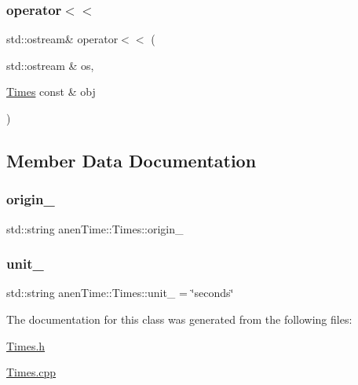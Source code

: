 \subsubsection{\texorpdfstring{operator$<$$<$}{operator<<}}
{\footnotesize\ttfamily std\+::ostream\& operator$<$$<$ (\begin{DoxyParamCaption}\item[{std\+::ostream \&}]{os,  }\item[{\mbox{\hyperlink{classanen_time_1_1_times}{Times}} const \&}]{obj }\end{DoxyParamCaption})\hspace{0.3cm}{\ttfamily [friend]}}



\subsection{Member Data Documentation}
\mbox{\label{classanen_time_1_1_times_a7e08602fb0628df1c5f1cccbb98baeb1}} 
\subsubsection{\texorpdfstring{origin\+\_\+}{origin\_}}
{\footnotesize\ttfamily std\+::string anen\+Time\+::\+Times\+::origin\+\_\+\hspace{0.3cm}{\ttfamily [protected]}}

\mbox{\label{classanen_time_1_1_times_a1bc1f74d961af9efa6462b2cbe5f3718}} 
\subsubsection{\texorpdfstring{unit\+\_\+}{unit\_}}
{\footnotesize\ttfamily std\+::string anen\+Time\+::\+Times\+::unit\+\_\+ = \char`\"{}seconds\char`\"{}\hspace{0.3cm}{\ttfamily [protected]}}



The documentation for this class was generated from the following files\+:\begin{DoxyCompactItemize}
\item 
\mbox{\hyperlink{_times_8h}{Times.\+h}}\item 
\mbox{\hyperlink{_times_8cpp}{Times.\+cpp}}\end{DoxyCompactItemize}
